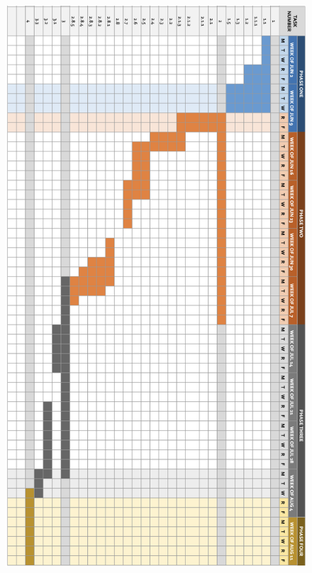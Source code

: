 \documentclass{article} %
\begin{document}
\newpage
\begin{figure}[ht]
  \centering
  \includegraphics[width=0.8\linewidth]{Figs/full-gantt.png}
  \label{fig:gantt}
\end{figure}

\end{document}

